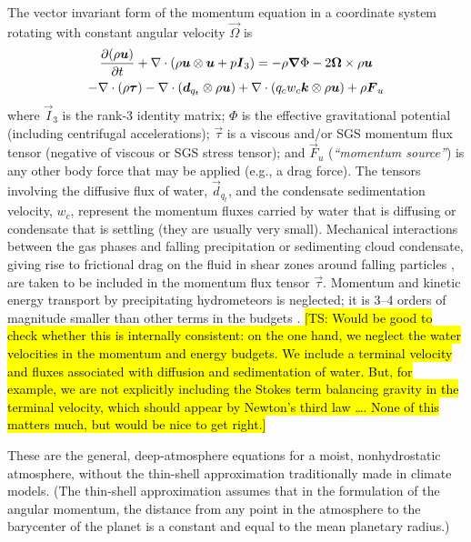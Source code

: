 \documentclass{report}
\begin{document}
The vector invariant form of the momentum equation in a coordinate system rotating with constant angular velocity $\vec{\Omega}$ is 
\begin{multline}
\frac{\partial (\rho\boldsymbol{{u}})}{\partial t} + \nabla \cdot \left( \rho\boldsymbol{{u}} \otimes \boldsymbol{{u}} + p \boldsymbol{{I}}_3\right) =
- \rho \boldsymbol{{\nabla}}\Phi - 2\boldsymbol{{\Omega}} \times \rho\boldsymbol{{u}} \\
- \nabla \cdot (\rho \boldsymbol{{\tau}}) - \nabla \cdot\left( \boldsymbol{{d}}_{q_t} \otimes \rho\boldsymbol{{u}} \right) + \nabla \cdot \left( q_c w_c \boldsymbol{{k}} \otimes \rho \boldsymbol{{u}} \right) + \rho \boldsymbol{{F}}_u
\label{eq:governing_equations/momentum}
\end{multline}
where $\vec{I}_3$ is the rank-3 identity matrix; $\Phi$ is the effective gravitational potential (including centrifugal accelerations); $\vec{\tau}$ is a viscous and/or SGS momentum flux tensor (negative of viscous or SGS stress tensor); and $\vec{F}_u$ (\emph{``momentum source''}) is any other body force that may be applied (e.g., a drag force). The tensors involving the diffusive flux of water, $\vec{d}_{q_t}$, and the condensate sedimentation velocity,  $w_c$, represent the momentum fluxes carried by water that is diffusing or condensate that is settling (they are usually very small). Mechanical interactions between the gas phases and falling precipitation or sedimenting cloud condensate, giving rise to frictional drag on the fluid in shear zones around falling particles \citep{Pauluis00}, are taken to be included in the momentum flux tensor $\vec{\tau}$. Momentum and kinetic energy transport by precipitating hydrometeors is neglected; it is 3--4 orders of magnitude smaller than other terms in the budgets \citep{Romps08a}. \hl{[TS: Would be good to check whether this is internally consistent: on the one hand, we neglect the water velocities in the  momentum and energy budgets. We include a terminal velocity and fluxes associated with diffusion and sedimentation of water. But, for example, we are not explicitly including the Stokes term balancing gravity in the terminal velocity, which should appear by Newton's third law \dots. None of this matters much, but would be nice to get right.]} 

These are the general, deep-atmosphere equations for a moist, nonhydrostatic atmosphere, without the thin-shell approximation traditionally made in climate models. (The thin-shell approximation assumes that in the formulation of the angular momentum, the distance from any point in the atmosphere to the barycenter of the planet is a constant and equal to the mean planetary radius.)
\end{document}
